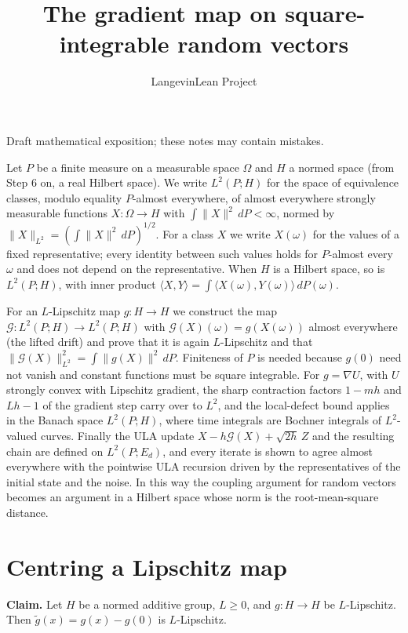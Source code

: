 \documentclass[11pt,a4paper]{article}
\title{\texorpdfstring{The gradient map on square-integrable random vectors}{The gradient map on square-integrable random vectors}}
\author{LangevinLean Project}
\date{}
\begin{document}
\maketitle
Draft mathematical exposition; these notes may contain mistakes.


Let \(P\) be a finite measure on a measurable space \(\Omega\) and \(H\) a normed space (from Step 6 on, a real Hilbert space). We write \(L^2(P;H)\) for the space of equivalence classes, modulo equality \(P\)-almost everywhere, of almost everywhere strongly measurable functions \(X:\Omega\to H\) with \(\int\|X\|^2\,dP<\infty\), normed by \(\|X\|_{L^2}=(\int\|X\|^2\,dP)^{1/2}\). For a class \(X\) we write \(X(\omega)\) for the values of a fixed representative; every identity between such values holds for \(P\)-almost every \(\omega\) and does not depend on the representative. When \(H\) is a Hilbert space, so is \(L^2(P;H)\), with inner product \(\langle X,Y\rangle=\int\langle X(\omega),Y(\omega)\rangle\,dP(\omega)\).




For an \(L\)-Lipschitz map \(g:H\to H\) we construct the map \(\mathcal G:L^2(P;H)\to L^2(P;H)\) with \(\mathcal G(X)(\omega)=g(X(\omega))\) almost everywhere (the lifted drift) and prove that it is again \(L\)-Lipschitz and that \(\|\mathcal G(X)\|_{L^2}^2=\int\|g(X)\|^2\,dP\). Finiteness of \(P\) is needed because \(g(0)\) need not vanish and constant functions must be square integrable. For \(g=\nabla U\), with \(U\) strongly convex with Lipschitz gradient, the sharp contraction factors \(1-mh\) and \(Lh-1\) of the gradient step carry over to \(L^2\), and the local-defect bound applies in the Banach space \(L^2(P;H)\), where time integrals are Bochner integrals of \(L^2\)-valued curves. Finally the ULA update \(X-h\mathcal G(X)+\sqrt{2h}\,Z\) and the resulting chain are defined on \(L^2(P;E_d)\), and every iterate is shown to agree almost everywhere with the pointwise ULA recursion driven by the representatives of the initial state and the noise. In this way the coupling argument for random vectors becomes an argument in a Hilbert space whose norm is the root-mean-square distance.


\section{\texorpdfstring{Centring a Lipschitz map}{Centring a Lipschitz map}}


\textbf{Claim.} Let \(H\) be a normed additive group, \(L\ge0\), and \(g:H\to H\) be \(L\)-Lipschitz. Then \(\tilde g(x)=g(x)-g(0)\) is \(L\)-Lipschitz.
\end{document}
